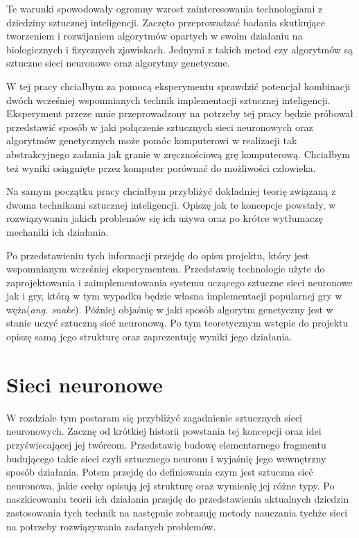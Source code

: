 \documentclass[12pt, oneside, a4paper]{report}
\begin{document}
Te warunki spowodowały ogromny wzrost zainteresowania technologiami z dziedziny sztucznej inteligencji. Zaczęto przeprowadzać badania skutkujące tworzeniem i rozwijaniem algorytmów opartych w swoim działaniu na biologicznych i fizycznych zjawiskach. Jednymi z takich metod czy algorytmów są sztuczne sieci neuronowe oraz algorytmy genetyczne.

W tej pracy chciałbym za pomocą eksperymentu sprawdzić potencjał kombinacji dwóch wcześniej wspomnianych technik implementacji sztucznej inteligencji. Eksperyment przeze mnie przeprowadzony na potrzeby tej pracy będzie próbował przedstawić sposób w jaki połączenie sztucznych sieci neuronowych oraz algorytmów genetycznych może pomóc komputerowi w realizacji tak abstrakcyjnego zadania jak granie w zręcznościową grę komputerową. Chciałbym też wyniki osiągnięte przez komputer porównać do możliwości człowieka.

Na samym początku pracy chciałbym przybliżyć dokładniej teorię związaną z dwoma technikami sztucznej inteligencji. Opiszę jak te koncepcje powstały, w rozwiązywaniu jakich problemów się ich używa oraz po krótce wytłumaczę mechaniki ich działania.

Po przedstawieniu tych informacji przejdę do opisu projektu, który jest wspomnianym wcześniej eksperymentem. Przedstawię technologie użyte do zaprojektowania i zaimplementowania systemu uczącego sztuczne sieci neuronowe jak i gry, którą w tym wypadku będzie własna implementacji popularnej gry w węża(\textit{ang. snake}). Później objaśnię w jaki sposób algorytm genetyczny jest w stanie uczyć sztuczną sieć neuronową. Po tym teoretycznym wstępie do projektu opiszę samą jego strukturę oraz zaprezentuję wyniki jego działania. 


\chapter{Sieci neuronowe}

W rozdziale tym postaram się przybliżyć zagadnienie sztucznych sieci neuronowych. Zacznę od krótkiej historii powstania tej koncepcji oraz idei przyświecającej jej twórcom. Przedstawię budowę elementarnego fragmentu budującego takie sieci czyli sztucznego neuronu i wyjaśnię jego wewnętrzny sposób działania. Potem przejdę do definiowania czym jest sztuczna sieć neuronowa, jakie cechy opisują jej strukturę oraz wymienię jej różne typy. Po naszkicowaniu teorii ich działania przejdę do przedstawienia aktualnych dziedzin zastosowania tych technik na następnie zobrazuję metody nauczania tychże sieci na potrzeby rozwiązywania zadanych problemów.
\end{document}
